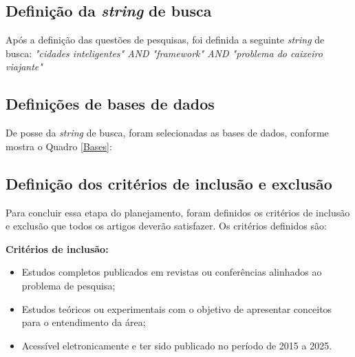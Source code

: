 \subsection{Definição da \textit{string} de busca}
Após a definição das questões de pesquisas, foi definida a seguinte \textit{string} de busca: \textit{"cidades inteligentes" AND "framework" AND "problema do caixeiro viajante" }


\subsection{Definições de bases de dados}
De posse da \textit{string} de busca, foram selecionadas as bases de dados, conforme mostra o Quadro \ref{Bases}:
	\begin{quadro}[h!]	
		\centering
	\end{quadro}


\subsection{Definição dos critérios de inclusão e exclusão}
\label{cap:questoes-de-pesquisa}
Para concluir essa etapa do planejamento, foram definidos os critérios de inclusão e exclusão que todos os artigos deverão satisfazer. Os critérios definidos são: 

\textbf{Critérios de inclusão: }
    \begin{itemize}
        \item Estudos completos publicados em revistas ou conferências alinhados ao problema de pesquisa;
        \item Estudos teóricos ou experimentais com o objetivo de apresentar conceitos para o entendimento da área;
        \item Acessível eletronicamente e ter sido publicado no período de 2015 a 2025.
    \end{itemize}

